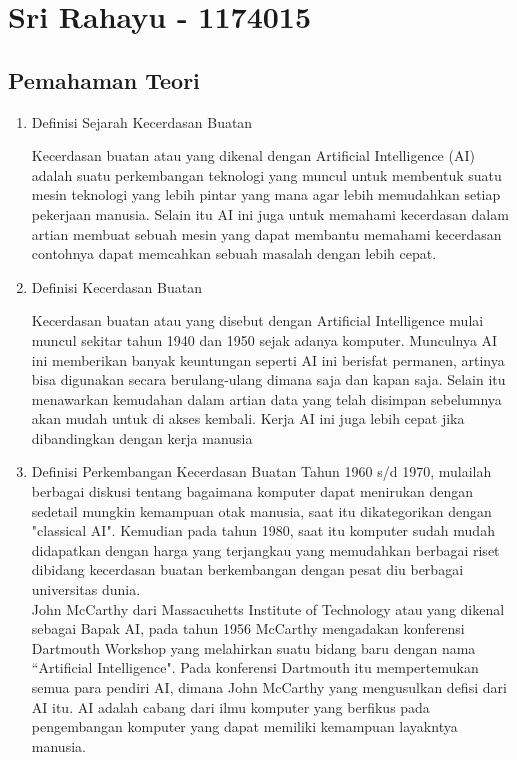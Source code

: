 \section{Sri Rahayu - 1174015}
\subsection{Pemahaman Teori}

\begin{enumerate}

\item Definisi Sejarah Kecerdasan Buatan

Kecerdasan buatan atau yang dikenal dengan Artificial Intelligence (AI) adalah suatu perkembangan teknologi yang muncul untuk membentuk suatu mesin teknologi yang lebih pintar yang mana agar lebih memudahkan setiap pekerjaan manusia. Selain itu AI ini juga untuk memahami kecerdasan dalam artian membuat sebuah mesin yang dapat membantu memahami kecerdasan contohnya dapat memcahkan sebuah masalah dengan lebih cepat.

\item Definisi Kecerdasan Buatan

Kecerdasan buatan atau yang disebut dengan Artificial Intelligence mulai muncul sekitar tahun 1940 dan 1950 sejak adanya komputer. Munculnya AI ini memberikan banyak keuntungan seperti AI ini berisfat permanen, artinya bisa digunakan secara berulang-ulang dimana saja dan kapan saja. Selain itu menawarkan kemudahan dalam artian data yang telah disimpan sebelumnya akan mudah untuk di akses kembali. Kerja AI ini juga lebih cepat jika dibandingkan dengan kerja manusia


\item Definisi Perkembangan Kecerdasan Buatan
Tahun 1960 s/d 1970, mulailah berbagai diskusi tentang bagaimana komputer dapat menirukan dengan sedetail mungkin kemampuan otak manusia, saat itu dikategorikan dengan "classical AI". Kemudian pada tahun 1980, saat itu komputer sudah mudah didapatkan dengan harga yang terjangkau yang memudahkan berbagai riset dibidang kecerdasan buatan berkembangan dengan pesat diu berbagai universitas dunia.\\

John McCarthy dari Massacuhetts Institute of Technology atau yang dikenal sebagai Bapak AI, pada tahun 1956 McCarthy mengadakan konferensi Dartmouth Workshop yang melahirkan suatu bidang baru dengan nama “Artificial Intelligence". Pada konferensi Dartmouth itu mempertemukan semua para pendiri AI, dimana John McCarthy yang mengusulkan defisi dari AI itu. AI adalah cabang dari ilmu komputer yang berfikus pada pengembangan komputer yang dapat memiliki kemampuan layakntya manusia.


\end{enumerate}
